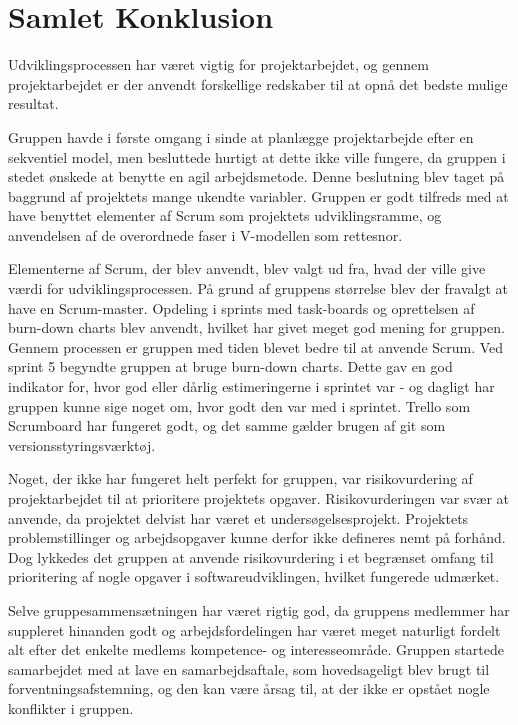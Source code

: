 \chapter{Samlet Konklusion}\label{SamletKonklusion}
Udviklingsprocessen har været vigtig for projektarbejdet, og gennem projektarbejdet er der anvendt forskellige redskaber til at opnå det bedste mulige resultat. 

Gruppen havde i første omgang i sinde at planlægge projektarbejde efter en sekventiel model, men besluttede hurtigt at dette ikke ville fungere, da gruppen i stedet ønskede at benytte en agil arbejdsmetode. Denne beslutning blev taget på baggrund af projektets mange ukendte variabler. Gruppen er godt tilfreds med at have benyttet elementer af Scrum som projektets udviklingsramme, og anvendelsen af de overordnede faser i V-modellen som rettesnor.

Elementerne af Scrum, der blev anvendt, blev valgt ud fra, hvad der ville give værdi for udviklingsprocessen. På grund af gruppens størrelse blev der fravalgt at have en Scrum-master. Opdeling i sprints med task-boards og oprettelsen af burn-down charts blev anvendt, hvilket har givet meget god mening for gruppen. Gennem processen er gruppen med tiden blevet bedre til at anvende Scrum. Ved sprint 5 begyndte gruppen at bruge burn-down charts. Dette gav en god indikator for, hvor god eller dårlig estimeringerne i sprintet var - og dagligt har gruppen kunne sige noget om, hvor godt den var med i sprintet. Trello som Scrumboard har fungeret godt, og det samme gælder brugen af git som versionsstyringsværktøj.

Noget, der ikke har fungeret helt perfekt for gruppen, var risikovurdering af projektarbejdet til at prioritere projektets opgaver. Risikovurderingen var svær at anvende, da projektet delvist har været et undersøgelsesprojekt. Projektets problemstillinger og arbejdsopgaver kunne derfor ikke defineres nemt på forhånd. Dog lykkedes det gruppen at anvende risikovurdering i et begrænset omfang til prioritering af nogle opgaver i softwareudviklingen, hvilket fungerede udmærket. 

Selve gruppesammensætningen har været rigtig god, da gruppens medlemmer har suppleret hinanden godt og arbejdsfordelingen har været meget naturligt fordelt alt efter det enkelte medlems kompetence- og interesseområde. Gruppen startede samarbejdet med at lave en samarbejdsaftale, som hovedsageligt blev brugt til forventningsafstemning, og den kan være årsag til, at der ikke er opstået nogle konflikter i gruppen. 